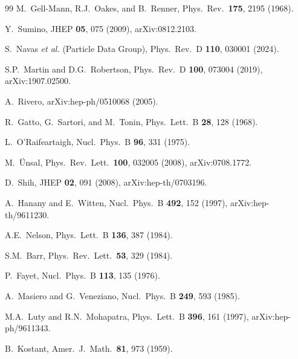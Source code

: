 \documentclass[12pt,a4paper]{article}
\begin{document}
\begin{thebibliography}{99}
  M.~Gell-Mann, R.J.~Oakes, and B.~Renner,
  Phys.\ Rev.\ \textbf{175}, 2195 (1968).

  Y.~Sumino,
  JHEP \textbf{05}, 075 (2009),
  arXiv:0812.2103.

  S.~Navas \textit{et al.} (Particle Data Group),
  Phys.\ Rev.\ D \textbf{110}, 030001 (2024).

  S.P.~Martin and D.G.~Robertson,
  Phys.\ Rev.\ D \textbf{100}, 073004 (2019),
  arXiv:1907.02500.

  A.~Rivero,
  arXiv:hep-ph/0510068 (2005).

  R.~Gatto, G.~Sartori, and M.~Tonin,
  Phys.\ Lett.\ B \textbf{28}, 128 (1968).

  L.~O'Raifeartaigh,
  Nucl.\ Phys.\ B \textbf{96}, 331 (1975).

  M.~\"Unsal,
  Phys.\ Rev.\ Lett.\ \textbf{100}, 032005 (2008),
  arXiv:0708.1772.

  D.~Shih,
  JHEP \textbf{02}, 091 (2008),
  arXiv:hep-th/0703196.

  A.~Hanany and E.~Witten,
  Nucl.\ Phys.\ B \textbf{492}, 152 (1997),
  arXiv:hep-th/9611230.

  A.E.~Nelson,
  Phys.\ Lett.\ B \textbf{136}, 387 (1984).

  S.M.~Barr,
  Phys.\ Rev.\ Lett.\ \textbf{53}, 329 (1984).

  P.~Fayet,
  Nucl.\ Phys.\ B \textbf{113}, 135 (1976).

  A.~Masiero and G.~Veneziano,
  Nucl.\ Phys.\ B \textbf{249}, 593 (1985).

  M.A.~Luty and R.N.~Mohapatra,
  Phys.\ Lett.\ B \textbf{396}, 161 (1997),
  arXiv:hep-ph/9611343.

  B.~Kostant,
  Amer.\ J.\ Math.\ \textbf{81}, 973 (1959).

\end{thebibliography}
\end{document}
